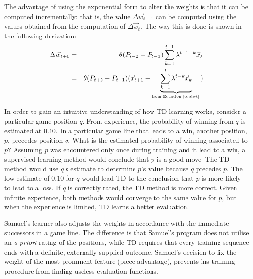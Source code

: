 The advantage of using the exponential form to alter the weights is that it can be computed incrementally: that is, the value $\Delta \vec{w}_{t+1} $ can be computed using the values obtained from the computation of $\Delta \vec{w}_t $.  The way this is done is shown in the following derivation:
\begin{eqnarray}
\nonumber \Delta \vec{w}_{t+1} 
	&=
	& \theta(P_{t+2} - P_{t-1}) 
	\sum_{k=1}^{t+1} \lambda^{t+1-k} \vec{x}_k \\
\nonumber 
	&= 
	&\theta(P_{t+2} - P_{t-1}) (\vec{x}_{t+1} + 
	\underbrace{\sum_{k=1}^t \lambda^{t-k} \vec{x}_k} _{\mbox{\tiny from  \refeq{dwt} }}) 
\end{eqnarray}

In order to gain an intuitive understanding of how TD learning works, consider a particular game position $q$.  From experience, the probability of winning from $q$ is estimated at $0.10$.  In a particular game line that leads to a win, another position, $p$, precedes position $q$. What is the estimated probability of winning associated to $p$?  Assuming $p$ was encountered only once during training and it lead to a win, a supervised learning method would conclude that $p$ is a good move.  The TD method would use $q$'s estimate to determine $p$'s value because $q$ precedes $p$.  The low estimate of $0.10$ for $q$ would lead TD to the conclusion that $p$ is more likely to lead to a loss.  If $q$ is correctly rated, the TD method is more correct.  Given infinite experience, both methods would converge to the same value for $p$, but when the  experience is limited, TD learns a better evaluation.  

Samuel's \cite{samuel:checkers}  learner also adjusts the weights in accordance with the immediate successors in a game line.  The difference is that Samuel's program does not utilise an \textit{a priori} rating of the positions, while TD requires that every training sequence ends with a definite, externally supplied outcome. Samuel's decision to fix the weight of the most prominent feature (piece advantage), prevents his training procedure from finding useless evaluation functions. 
%

